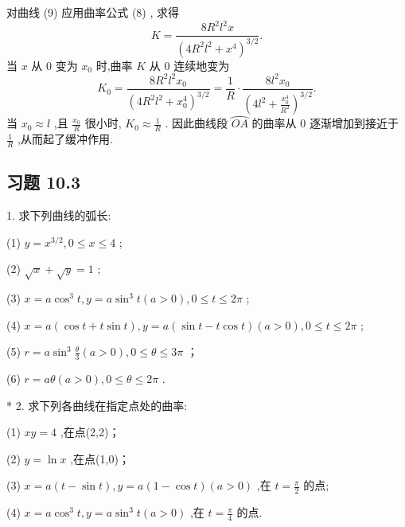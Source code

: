 对曲线 (9) 应用曲率公式 (8) , 求得
\[
K = \frac{8{R}^{2}{l}^{2}x}{{\left( 4{R}^{2}{l}^{2} + {x}^{4}\right) }^{3/2}}.
\]
当 \(x\) 从 0 变为 \({x}_{0}\) 时,曲率 \(K\) 从 0 连续地变为
\[
{K}_{0} = \frac{8{R}^{2}{l}^{2}{x}_{0}}{{\left( 4{R}^{2}{l}^{2} + {x}_{0}^{4}\right) }^{3/2}} = \frac{1}{R} \cdot  \frac{8{l}^{2}{x}_{0}}{{\left( 4{l}^{2} + \frac{{x}_{0}^{4}}{{R}^{2}}\right) }^{3/2}}.
\]
当 \({x}_{0} \approx  l\) ,且 \(\frac{{x}_{0}}{R}\) 很小时, \({K}_{0} \approx  \frac{1}{R}\) . 因此曲线段 \(\overset{⏜}{OA}\) 的曲率从 0 逐渐增加到接近于 \(\frac{1}{R}\) ,从而起了缓冲作用.

\subsection{习题 10.3}



1. 求下列曲线的弧长:

\hspace*{1em} (1) \(y = {x}^{3/2},0 \leq  x \leq  4\) ;

\hspace*{1em} (2) \(\sqrt{x} + \sqrt{y} = 1\) ;

\hspace*{1em} (3) \(x = a{\cos }^{3}t,y = a{\sin }^{3}t\left( {a > 0}\right) ,0 \leq  t \leq  {2\pi }\) ;

\hspace*{1em} (4) \(x = a\left( {\cos t + t\sin t}\right) ,y = a\left( {\sin t - t\cos t}\right) \left( {a > 0}\right) ,0 \leq  t \leq  {2\pi }\) ;

\hspace*{1em} (5) \(r = a{\sin }^{3}\frac{\theta }{3}\left( {a > 0}\right) ,0 \leq  \theta  \leq  {3\pi }\) ；

\hspace*{1em} (6) \(r = {a\theta }\left( {a > 0}\right) ,0 \leq  \theta  \leq  {2\pi }\) .

* 2. 求下列各曲线在指定点处的曲率:

\hspace*{1em} (1) \({xy} = 4\) ,在点(2,2)；

\hspace*{1em} (2) \(y = \ln x\) ,在点(1,0)；

\hspace*{2em} (3) \(x = a\left( {t - \sin t}\right) ,y = a\left( {1 - \cos t}\right) \left( {a > 0}\right)\) ,在 \(t = \frac{\pi }{2}\) 的点;

\hspace*{1em} (4) \(x = a{\cos }^{3}t,y = a{\sin }^{3}t\left( {a > 0}\right)\) ,在 \(t = \frac{\pi }{4}\) 的点.



